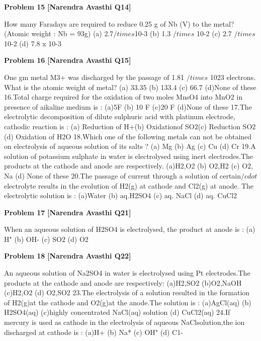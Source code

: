 \begin{problembox}
\textbf{Problem 15} \hfill \textbf{[Narendra Avasthi Q14]}
\label{q:ext-narendra_avasthi_all_questions-15}

How many Faradays are required to reduce 0.25 g of Nb (V) to the metal?
(Atomic weight : Nb = 93g)
(a) 2.7$/times$10-3
(b) 1.3 $/times$ 10-2
(c) 2.7 $/times$10-2
(d) 7.8 x 10-3
\end{problembox}

\begin{problembox}
\textbf{Problem 16} \hfill \textbf{[Narendra Avasthi Q15]}
\label{q:ext-narendra_avasthi_all_questions-16}

One gm metal M3+ was discharged by the passage of 1.81 $/times$ 1023 electrons. What is the atomic
weight of metal?
(a) 33.35
(b) 133.4
(c) 66.7
(d)None of these
16.Total charge required for the oxidation of two moles MnsO4 into MnO2 in presence of
aikaline medium is :
(a)5F
(b) 10 F
(c)20 F
(d)None of these
17.The electrolytic decomposition of dilute sulphuric acid with platinum electrode, cathodic
reaction is :
(a) Reduction of H+(b) Oxidationof SO$2$(c) Reduction SO$2$(d) Oxidation of H2O
18.Which one of the following metals can not be obtained on electrolysis of aqueous solution of
its salts ?
(a) Mg
(b) Ag
(c) Cu
(d) Cr
19.A solution of potassium sulphate in water is electrolysed using inert electrodes.The products
at the cathode and anode are respectively.
(a)H2,O2
(b) O2,H2
(c) O2, Na
(d) None of these
20.The passage of current through a solution of certain$/cdot$electrolyte results in the evolution of
H2(g) at cathode and Cl2(g) at anode. The electrolytic solution is :
(a)Water
(b) aq.H2SO4
(c) aq. NaCl
(d) aq. CuCl2
\end{problembox}

\begin{problembox}
\textbf{Problem 17} \hfill \textbf{[Narendra Avasthi Q21]}
\label{q:ext-narendra_avasthi_all_questions-17}

When an aqueous solution of H2SO4 is electrolysed, the product at anode is :
(a) H"
(b) OH-
(c) SO$2$
(d) O2
\end{problembox}

\begin{problembox}
\textbf{Problem 18} \hfill \textbf{[Narendra Avasthi Q22]}
\label{q:ext-narendra_avasthi_all_questions-18}

An aqueous solution of Na2SO4 in water is electrolysed using Pt electrodes.The products at
the cathode and anode are respectively:
(a)H2,SO2
(b)O2,NaOH
(c)H2,O2
(d) O2,SO2
23.The electrolysis of a solution resulted in the formation of H2(g)at the cathode and O2(g)at
the anode.The solution is :
(a)AgCl(aq)
(b) H2SO4(aq)
(c)highly concentrated NaCl(aq) solution
(d) CuCl2(aq)
24.If mercury is used as cathode in the electrolysis of aqueous NaClsolution,the ion discharged at
cathode is :
(a)H+
(b) Na*
(c) OH"
(d) C1-
\end{problembox}


